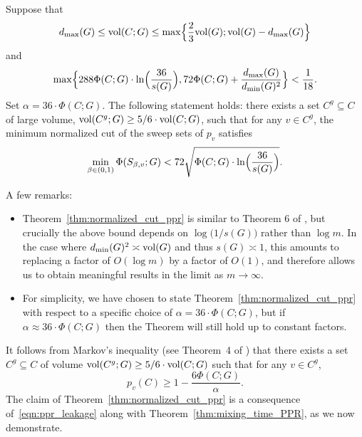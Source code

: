 \begin{theorem}
	\label{thm:normalized_cut_ppr}
	Suppose that
	\begin{equation}
	\label{eqn:normalized_cut_ppr_vol}
	d_{\max}(G) \leq \mathrm{vol}(C;G) \leq \max\Bigl\{\frac{2}{3}\mathrm{vol}(G); \mathrm{vol}(G) - d_{\max}(G)\Bigr\}
	\end{equation}
	and
	\begin{equation}
	\label{eqn:normalized_cut_ppr_ncut}
	\max\Bigl\{288\Phi(C;G)\cdot \ln\Bigl(\frac{36}{s(G)}\Bigr),72\Phi(C;G) + \frac{d_{\max}(G)}{d_{\min}(G)^2}\Bigr\} < \frac{1}{18}.
	\end{equation}
	Set $\alpha = 36 \cdot \Phi(C;G)$. The following statement holds: there exists a set $C^g \subseteq C$ of large volume, $\mathrm{vol}(C^g;G) \geq 5/6 \cdot \mathrm{vol}(C;G)$, such that for any $v \in C^g$,  the minimum normalized cut of the sweep sets of $p_v$ satisfies 
	\begin{equation}
	\label{eqn:normalized_cut_ppr}
	\min_{\beta \in (0,1)}\Phi(S_{\beta,v};G) < 72\sqrt{\Phi(C;G) \cdot \ln\Bigl(\frac{36}{s(G)}\Bigr)}.
	\end{equation}
\end{theorem}
A few remarks:
\begin{itemize}
	\item Theorem~\ref{thm:normalized_cut_ppr} is similar to Theorem 6 of \citet{andersen2006}, but crucially the above bound depends on $\log\bigl(1/s(G)\bigr)$ rather than $\log m$. In the case where $d_{\min}(G)^2 \asymp \mathrm{vol}(G)$ and thus $s(G) \asymp 1$, this amounts to replacing a factor of $O(\log m)$ by a factor of ${O}(1)$, and therefore allows us to obtain meaningful results in the limit as $m \to \infty$. 
	\item For simplicity, we have chosen to state Theorem~\ref{thm:normalized_cut_ppr} with respect to a specific choice of $\alpha = 36 \cdot \Phi(C;G)$, but if $\alpha \approx 36 \cdot \Phi(C;G)$ then the Theorem will still hold up to constant factors.
\end{itemize}

It follows from Markov's inequality (see Theorem~4 of \cite{andersen2006}) that there exists a set $C^g \subseteq C$ of volume $\mathrm{vol}(C^g;G) \geq 5/6 \cdot \mathrm{vol}(C;G)$ such that for any $v \in C^g$,
\begin{equation}
\label{eqn:ppr_leakage}
p_v(C) \geq 1 - \frac{6\Phi(C;G)}{\alpha}.
\end{equation}
The claim of Theorem~\ref{thm:normalized_cut_ppr} is a consequence of~\eqref{eqn:ppr_leakage} along with Theorem~\ref{thm:mixing_time_PPR}, as we now demonstrate.
